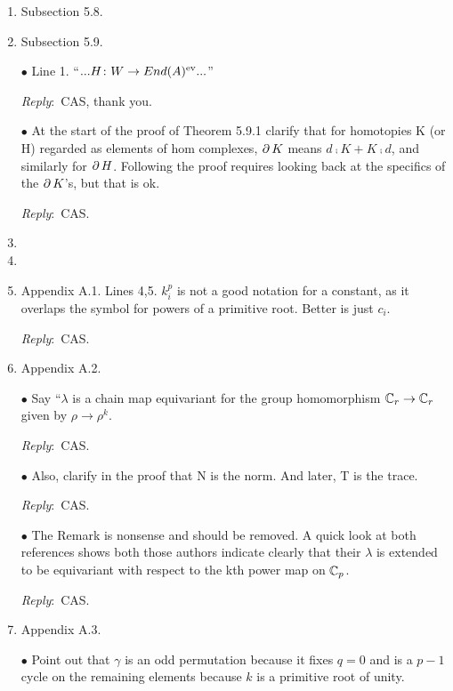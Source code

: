 \documentclass{amsart}
\newcommand{\ar}{\medskip\noindent\textit{Reply}:\ }
\def\subitem{\medskip\noindent$\bullet$ }
\begin{document}
\begin{enumerate}
	\ar We have added more explanations.
	It now reads:
	``Since $\AW(x \times y \times z) = v \ot \AW(y \times z)$ for any triple of simplices $x,y,z$ with $x = v$ a $0$-simplex or the image of one via a degeneracy maps $x = \mathrm{s}(v)$, we have ..."

	\item Subsection 5.8.

	

	\item Subsection 5.9.

	\subitem Line 1. “$... H \colon W \to End(A)^{\mathrm{ev}} ... $”

	\ar CAS, thank you.

	\subitem At the start of the proof of Theorem 5.9.1 clarify that for homotopies K (or H) regarded
	as elements of hom complexes, $\operatorname{\partial} K$ means $d \comp K + K \comp d$, and similarly for $\operatorname{\partial} H$.
	Following the proof requires looking back at the specifics of the $\operatorname{\partial} K$’s, but that is ok.

	\ar CAS.

	\item 

	\item 

	\item Appendix A.1. Lines 4,5. $k_i^p$ is not a good notation for a constant, as it overlaps the
	symbol for powers of a primitive root.
	Better is just $c_i$.

	\ar CAS.

	\item Appendix A.2.

	\subitem Say “$\lambda$ is a chain map equivariant for the group homomorphism $\mathbb{C}_r \to \mathbb{C}_r$
	given by $\rho \to \rho^k$.

	\ar CAS.

	\subitem Also, clarify in the proof that N is the norm. And later, T is the
	trace.

	\ar CAS.

	\subitem The Remark is nonsense and should be removed.
	A quick look at both references shows
	both those authors indicate clearly that their $\lambda$ is extended to be equivariant with respect
	to the kth power map on $\mathbb{C}_p$.

	\ar CAS.

	\item Appendix A.3.

	\subitem Point out that $\gamma$ is an odd permutation because it fixes $q = 0$ and is a
	$p-1$ cycle on the remaining elements because $k$ is a primitive root of unity.


\end{enumerate}
\end{document}
